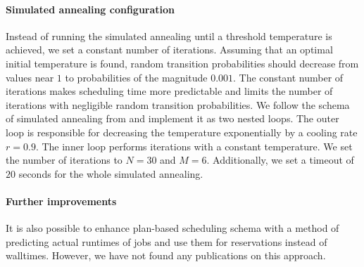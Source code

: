 \documentclass[thesis-en.tex]{subfiles}
\begin{document}
\paragraph{Simulated annealing configuration}
Instead of running the simulated annealing until a threshold temperature is achieved, we set a constant number of iterations. Assuming that an optimal initial temperature is found, random transition probabilities should decrease from values near $1$ to probabilities of the magnitude $0.001$. The constant number of iterations makes scheduling time more predictable and limits the number of iterations with negligible random transition probabilities. We follow the schema of simulated annealing from \cite{zheng2016exploring} and implement it as two nested loops. The outer loop is responsible for decreasing the temperature exponentially by a cooling rate $r=0.9$. The inner loop performs iterations with a constant temperature. We set the number of iterations to $N=30$ and $M=6$. Additionally, we set a timeout of $20$ seconds for the whole simulated annealing.

\paragraph{Further improvements}
It is also possible to enhance plan-based scheduling schema with a method of predicting actual runtimes of jobs and use them for reservations instead of walltimes. However, we have not found any publications on this approach.
\end{document}
